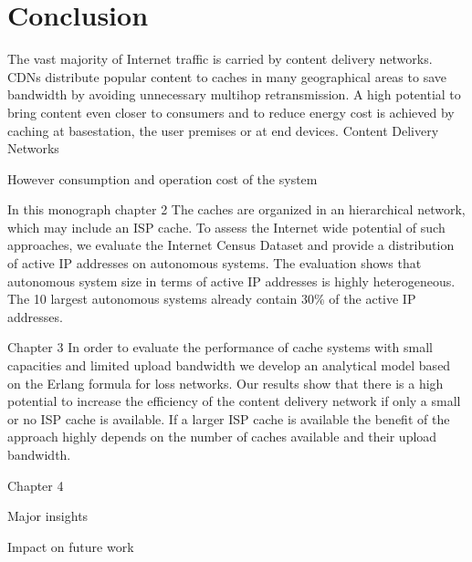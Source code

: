 \chapter{Conclusion}\label{chap:conclusion}

The vast majority of Internet traffic is carried by content delivery networks.
CDNs distribute popular content to caches in many geographical areas to save bandwidth by avoiding unnecessary multihop retransmission.
A high potential to bring content even closer to consumers and to reduce energy cost is achieved by caching at basestation, the user premises or at end devices.
Content Delivery Networks


However
consumption and operation cost of the system

In this monograph
chapter 2
The caches are organized in an hierarchical network, which may include an ISP cache. To assess the Internet wide potential of such approaches, we evaluate the Internet Census Dataset and provide a distribution of active IP addresses on autonomous systems.
The evaluation shows that autonomous system size in terms of active IP addresses is highly heterogeneous.
The 10 largest autonomous systems already contain 30\% of the active IP addresses.

Chapter 3
In order to evaluate the performance of cache systems with small capacities and limited upload bandwidth we develop
an analytical model based on the Erlang formula for loss networks.
Our results show that there is a high potential to increase the efficiency of the content delivery network if only a small or no ISP cache is available.
If a larger ISP cache is available the benefit of the approach highly depends on the number of caches available and their upload bandwidth.

Chapter 4

Major insights

Impact on future work
